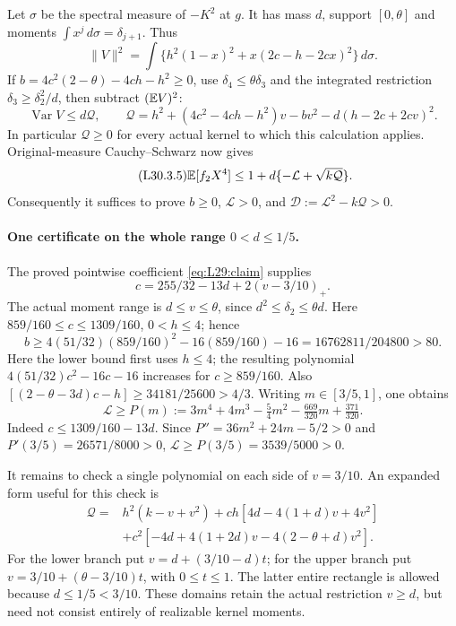 Let \(\sigma\) be the spectral measure of \(-K^2\) at \(g\).
It has mass \(d\), support \([0,\theta]\) and moments
\(\int x^j\,d\sigma=\delta_{j+1}\). Thus
\[
 \|V\|^2=\int\{h^2(1-x)^2+x(2c-h-2cx)^2\}\,d\sigma.
\]
If \(b=4c^2(2-\theta)-4ch-h^2\ge0\), use
\(\delta_4\le\theta\delta_3\) and the integrated restriction
\(\delta_3\ge\delta_2^2/d\), then subtract \((\mathbb E V)^2\):
\begin{equation}\tag{L30.3.3}\label{eq:L30:Q}
 \operatorname{Var}V\le d\mathcal Q,
 \qquad
 \mathcal Q=h^2+(4c^2-4ch-h^2)v-bv^2-d(h-2c+2cv)^2.
\end{equation}
In particular \(\mathcal Q\ge0\) for every actual kernel to which this
calculation applies. Original-measure Cauchy--Schwarz now gives
\begin{equation}\tag{L30.3.5}\label{eq:L30:sharedbound}
 \mathbb E[f_2X^4]\le1+d\{-\mathcal L+\sqrt{k\mathcal Q}\}.
\end{equation}
Consequently it suffices to prove
\(b\ge0\), \(\mathcal L>0\), and
\(\mathcal D:=\mathcal L^2-k\mathcal Q>0\).

\paragraph{One certificate on the whole range \(0<d\le1/5\).}
The proved pointwise coefficient \eqref{eq:L29:claim} supplies
\begin{equation}\label{eq:reference-synthesis:coefficient}
 c=255/32-13d+2(v-3/10)_+.
\end{equation}
The actual moment range is \(d\le v\le\theta\), since
\(d^2\le\delta_2\le\theta d\).
Here \(859/160\le c\le1309/160\), \(0<h\le4\); hence
\[
 b\ge4(51/32)(859/160)^2-16(859/160)-16
       =16762811/204800>80.
\]
Here the lower bound first uses \(h\le4\); the resulting polynomial
\(4(51/32)c^2-16c-16\) increases for \(c\ge859/160\).
Also \([(2-\theta-3d)c-h]\ge34181/25600>4/3\).
Writing \(m\in[3/5,1]\), one obtains
\[
 \mathcal L\ge P(m):=
 3m^4+4m^3-\tfrac54m^2-\tfrac{669}{320}m+\tfrac{371}{320}.
\]
Indeed \(c\le1309/160-13d\). Since
\(P''=36m^2+24m-5/2>0\) and
\(P'(3/5)=26571/8000>0\),
\(\mathcal L\ge P(3/5)=3539/5000>0\).

It remains to check a single polynomial on each side of \(v=3/10\).
An expanded form useful for this check is
\[
\begin{aligned}
 \mathcal Q={}&h^2(k-v+v^2)
       +ch[4d-4(1+d)v+4v^2]\\
       &+c^2[-4d+4(1+2d)v-4(2-\theta+d)v^2].
\end{aligned}
\]
For the lower branch put \(v=d+(3/10-d)t\); for the upper branch
put \(v=3/10+(\theta-3/10)t\), with \(0\le t\le1\).
The latter entire rectangle is allowed because \(d\le1/5<3/10\).
These domains retain the actual restriction \(v\ge d\), but need
not consist entirely of realizable kernel moments.

